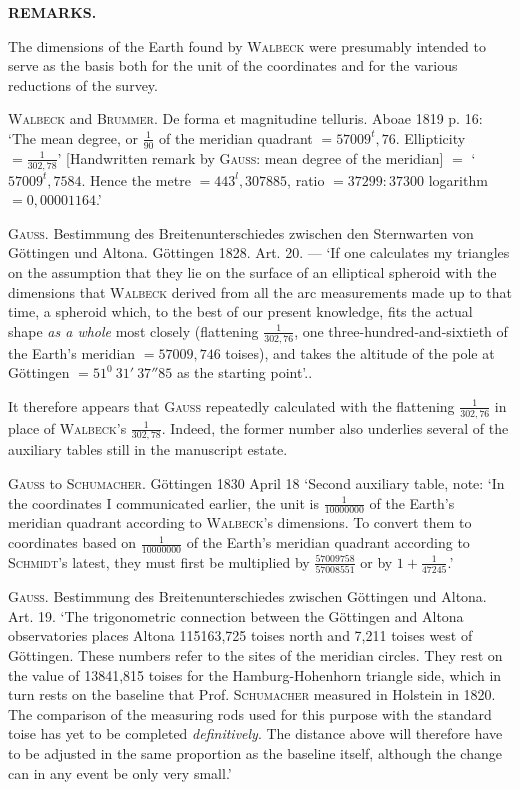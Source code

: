 \clearpage{}%
\begin{center}\textbf{REMARKS.}\end{center}

\indent The dimensions of the Earth found by \textsc{Walbeck} were presumably intended to serve as the basis both for the unit of the coordinates and for the various reductions of the survey.

\textsc{Walbeck} and \textsc{Brummer}. De forma et magnitudine telluris. Aboae 1819 p. 16: ‘The mean degree, or \(\frac{1}{90}\) of the meridian quadrant \(=57009^{t}{,}76\). Ellipticity \(=\frac{1}{302{,}78}\)’ [Handwritten remark by \textsc{Gauss}: mean degree of the meridian] \(=\) ‘\(57009^{t}{,}7584\). Hence the metre \(=443^{l}{,}307885\), ratio \(=37299:37300\) logarithm \(=0{,}00001164\).’

\textsc{Gauss}. Bestimmung des Breitenunterschiedes zwischen den Sternwarten von Göttingen und Altona. Göttingen 1828. Art. 20. — ‘If one calculates my triangles on the assumption that they lie on the surface of an elliptical spheroid with the dimensions that \textsc{Walbeck} derived from all the arc measurements made up to that time, a spheroid which, to the best of our present knowledge, fits the actual shape \textit{as a whole} most closely (flattening \(\frac{1}{302{,}76}\), one three-hundred-and-sixtieth of the Earth’s meridian \(=57009{,}746\) toises), and takes the altitude of the pole at Göttingen \(=51^{0}\ 31'\ 37''85\) as the starting point’..

It therefore appears that \textsc{Gauss} repeatedly calculated with the flattening \(\frac{1}{302{,}76}\) in place of \textsc{Walbeck}’s \(\frac{1}{302{,}78}\). Indeed, the former number also underlies several of the auxiliary tables still in the manuscript estate.

\textsc{Gauss} to \textsc{Schumacher}. Göttingen 1830 April 18 ‘Second auxiliary table, note: ‘In the coordinates I communicated earlier, the unit is \(\frac{1}{10000000}\) of the Earth’s meridian quadrant according to \textsc{Walbeck}’s dimensions. To convert them to coordinates based on \(\frac{1}{10000000}\) of the Earth’s meridian quadrant according to \textsc{Schmidt}’s latest, they must first be multiplied by \(\frac{57009758}{57008551}\) or by \(1+\frac{1}{47245}\).’

\textsc{Gauss}. Bestimmung des Breitenunterschiedes zwischen Göttingen und Altona. Art. 19. ‘The trigonometric connection between the Göttingen and Altona observatories places Altona 115163,725 toises north and 7,211 toises west of Göttingen. These numbers refer to the sites of the meridian circles. They rest on the value of 13841,815 toises for the Hamburg-Hohenhorn triangle side, which in turn rests on the baseline that Prof. \textsc{Schumacher} measured in Holstein in 1820. The comparison of the measuring rods used for this purpose with the standard toise has yet to be completed \textit{definitively}. The distance above will therefore have to be adjusted in the same proportion as the baseline itself, although the change can in any event be only very small.’

